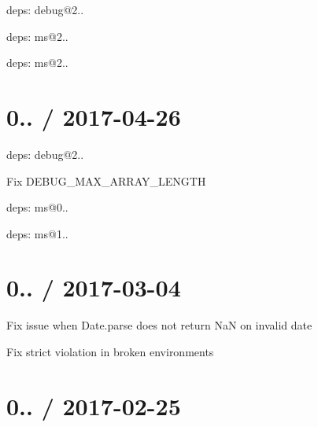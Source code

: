 \begin{DoxyItemize}
\item deps\+: debug@2..
\begin{DoxyItemize}
\item deps\+: ms@2..
\end{DoxyItemize}
\item deps\+: ms@2..
\end{DoxyItemize}

\section*{0.. / 2017-\/04-\/26 }


\begin{DoxyItemize}
\item deps\+: debug@2..
\begin{DoxyItemize}
\item Fix {\ttfamily D\+E\+B\+U\+G\+\_\+\+M\+A\+X\+\_\+\+A\+R\+R\+A\+Y\+\_\+\+L\+E\+N\+G\+TH}
\item deps\+: ms@0..
\end{DoxyItemize}
\item deps\+: ms@1..
\end{DoxyItemize}

\section*{0.. / 2017-\/03-\/04 }


\begin{DoxyItemize}
\item Fix issue when {\ttfamily Date.\+parse} does not return {\ttfamily NaN} on invalid date
\item Fix strict violation in broken environments
\end{DoxyItemize}

\section*{0.. / 2017-\/02-\/25 }


